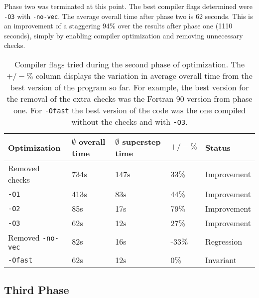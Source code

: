 \documentclass[twoside,11pt]{article}
\begin{document}
Phase two was terminated at this point.
The best compiler flags determined were \texttt{-O3} with
\texttt{-no-vec}.
The average overall time after phase two is 62 seconds.
This is an improvement of a staggering 94\% over the results after
phase one (1110 seconds), simply by enabling compiler optimization
and removing unnecessary checks.

\begin{table}
  \begin{tabu}{|l|X|l|X|X|}
    \hline
    Optimization &$\emptyset$ overall time
                 &$\emptyset$ superstep time  &$+/-\%$ &Status \\
    \hline
    Removed checks &734s &147s &33\% &Improvement \\
    \hline
    \texttt{-O1} &413s &83s &44\% &Improvement \\
    \hline
    \texttt{-O2} &85s &17s &79\% &Improvement \\
    \hline
    \texttt{-O3} &62s &12s &27\% &Improvement \\
    \hline
    Removed \texttt{-no-vec} &82s &16s &-33\% &Regression \\
    \hline
    \texttt{-Ofast} &62s &12s &0\% &Invariant \\
    \hline
  \end{tabu}
  \caption{Compiler flags tried during the second phase of
    optimization. The $+/-\%$ column displays the
    variation in average overall time from the best version of the
    program so far. For example, the best version for the removal of
    the extra checks was the Fortran 90 version from phase one.
    For \texttt{-Ofast} the best version of the code was the one
    compiled without the checks and with \texttt{-O3}.
  }
  \label{tab:p2}
\end{table}


\subsection{Third Phase} %
\label{subsec:p3}
\end{document}
